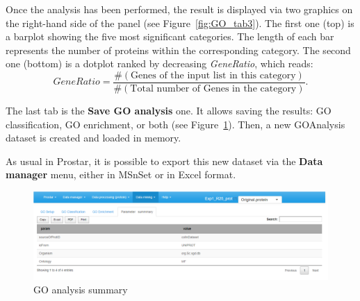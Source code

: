 \documentclass[12pt]{article}
\begin{document}
Once the analysis has been performed, the result is displayed via two graphics 
on the right-hand side of the panel (see Figure~\ref{fig:GO_tab3}). 
The first one (top) is a barplot showing the five most significant categories. The 
length of each bar represents the number of proteins within the corresponding category. 
The second one (bottom) is a dotplot ranked by decreasing \textit{GeneRatio}, which reads: 
$$
{\textit{GeneRatio}}
=
\frac{\#(\mbox{Genes of the input list in this category})}
{\#(\mbox{Total number of Genes in the category})}.
$$


The last tab is the \textbf{Save GO analysis} one. It allows saving the results:
GO classification, GO enrichment, or both (see Figure~\ref{fig:GO_tab4}).
Then, a new GOAnalysis dataset is created and loaded in memory. 

As usual in Prostar, it is possible to export this new dataset via the \textbf{Data
manager} menu, either in MSnSet or in Excel format. 

\begin {figure}
\includegraphics[width=\textwidth]{images/GO_tab4.png}
\caption{GO analysis summary}\label{fig:GO_tab4}
\end {figure}
\end{document}
